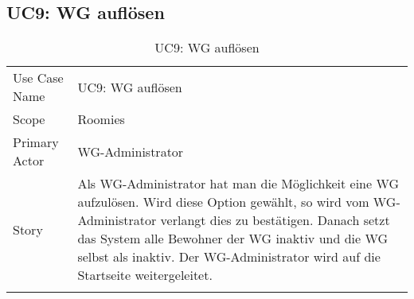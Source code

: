 \subsection{UC9: WG auflösen}
\begin{table}[H]
	\tablestyle
	\tablealtcolored
	\begin{tabularx}{\textwidth}{lX}
		\tablebody
			Use Case Name &
			UC9: WG auflösen
			\tabularnewline
			Scope &
			Roomies
			\tabularnewline
			Primary Actor &
			WG-Administrator
			\tabularnewline
			Story &
			Als WG-Administrator hat man die Möglichkeit eine WG aufzulösen. Wird diese Option gewählt, so wird vom WG-Administrator verlangt dies zu bestätigen. Danach setzt das System alle Bewohner der WG inaktiv und die WG selbst als inaktiv. Der WG-Administrator wird auf die Startseite weitergeleitet.
			\tabularnewline
		\tableend
	\end{tabularx}
	\caption{UC9: WG auflösen}
\end{table}


